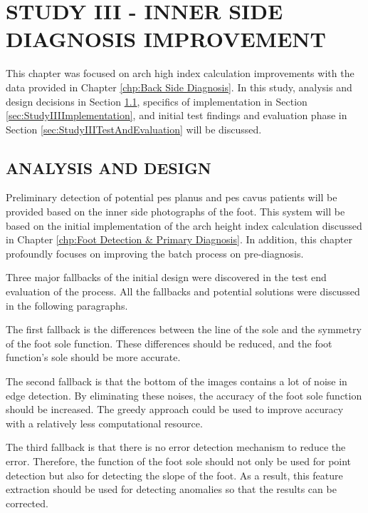 \chapter{STUDY III - INNER SIDE DIAGNOSIS IMPROVEMENT }\label{chp:Inner Side Diagnosis Improvement}

This chapter was focused on arch high index calculation improvements with the data provided in Chapter \ref{chp:Back Side Diagnosis}. In this study, analysis and design decisions in Section \ref{sec:StudyIIIAnalysisAndDesign}, specifics of implementation in Section \ref{sec:StudyIIIImplementation}, and initial test findings and evaluation phase in Section \ref{sec:StudyIIITestAndEvaluation} will be discussed.

\section{ANALYSIS AND DESIGN}\label{sec:StudyIIIAnalysisAndDesign}

Preliminary detection of potential pes planus and pes cavus patients will be provided based on the inner side photographs of the foot. This system will be based on the initial implementation of the arch height index calculation discussed in Chapter \ref{chp:Foot Detection & Primary Diagnosis}. In addition, this chapter profoundly focuses on improving the batch process on pre-diagnosis.

Three major fallbacks of the initial design were discovered in the test end evaluation of the process. All the fallbacks and potential solutions were discussed in the following paragraphs.

The first fallback is the differences between the line of the sole and the symmetry of the foot sole function. These differences should be reduced, and the foot function's sole should be more accurate.

The second fallback is that the bottom of the images contains a lot of noise in edge detection. By eliminating these noises, the accuracy of the foot sole function should be increased. The greedy approach could be used to improve accuracy with a relatively less computational resource.

The third fallback is that there is no error detection mechanism to reduce the error. Therefore, the function of the foot sole should not only be used for point detection but also for detecting the slope of the foot. As a result, this feature extraction should be used for detecting anomalies so that the results can be corrected.

